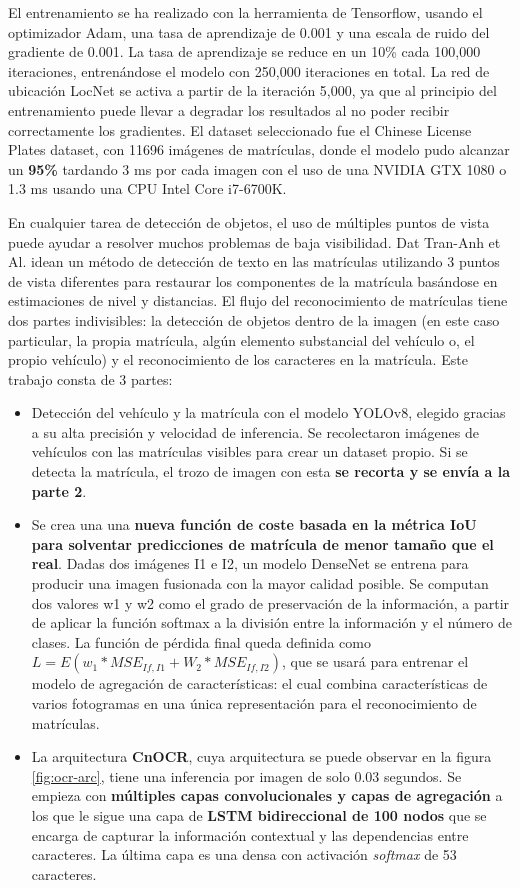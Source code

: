\documentclass[11pt]{article}
\begin{document}
El entrenamiento se ha realizado con la herramienta de Tensorflow, usando el optimizador Adam, una tasa de aprendizaje de 0.001 y una escala de ruido del gradiente de 0.001. La tasa de aprendizaje se reduce en un 10\% cada 100,000 iteraciones, entrenándose el modelo con 250,000 iteraciones en total. La red de ubicación LocNet se activa a partir de la iteración 5,000, ya que al principio del entrenamiento puede llevar a degradar los resultados al no poder recibir correctamente los gradientes. El dataset seleccionado fue el Chinese License Plates dataset, con 11696 imágenes de matrículas, donde el modelo pudo alcanzar un \textbf{95\%} tardando 3 ms por cada imagen con el uso de una NVIDIA GTX 1080 o 1.3 ms usando una CPU Intel Core i7-6700K.



En cualquier tarea de detección de objetos, el uso de múltiples puntos de vista puede ayudar a resolver muchos problemas de baja visibilidad. Dat Tran-Anh et Al.\cite{trananh2023licenseplaterecognitionbased} idean un método de detección de texto en las matrículas utilizando 3 puntos de vista diferentes para restaurar los componentes de la matrícula basándose en estimaciones de nivel y distancias. El flujo del reconocimiento de matrículas tiene dos partes indivisibles: la detección de objetos dentro de la imagen (en este caso particular, la propia matrícula, algún elemento substancial del vehículo o, el propio vehículo) y el reconocimiento de los caracteres en la matrícula. Este trabajo consta de 3 partes:
\begin{itemize}
    \item Detección del vehículo y la matrícula con el modelo YOLOv8, elegido gracias a su alta precisión y velocidad de inferencia. Se recolectaron imágenes de vehículos con las matrículas visibles para crear un dataset propio. Si se detecta la matrícula, el trozo de imagen con esta \textbf{se recorta y se envía a la parte 2}.
    \item Se crea una una \textbf{nueva función de coste basada en la métrica IoU para solventar predicciones de matrícula de menor tamaño que el real}. Dadas dos imágenes I1 e I2, un modelo DenseNet se entrena para producir una imagen fusionada con la mayor calidad posible. Se computan dos valores w1 y w2 como el grado de preservación de la información, a partir de aplicar la función softmax a la división entre la información y el número de clases. La función de pérdida final queda definida como $L = E(w_1 * MSE_{If, I1} + W_2 * MSE_{If, I2})$, que se usará para entrenar el modelo de agregación de características: el cual combina características de varios fotogramas en una única representación para el reconocimiento de matrículas.
    \item La arquitectura \textbf{CnOCR}, cuya arquitectura se puede observar en la figura \ref{fig:ocr-arc}, tiene una inferencia por imagen de solo 0.03 segundos. Se empieza con \textbf{múltiples capas convolucionales y capas de agregación} a los que le sigue una capa de \textbf{LSTM bidireccional de 100 nodos} que se encarga de capturar la información contextual y las dependencias entre caracteres. La última capa es una densa con activación \textit{softmax} de 53 caracteres.
\end{itemize}
\end{document}
